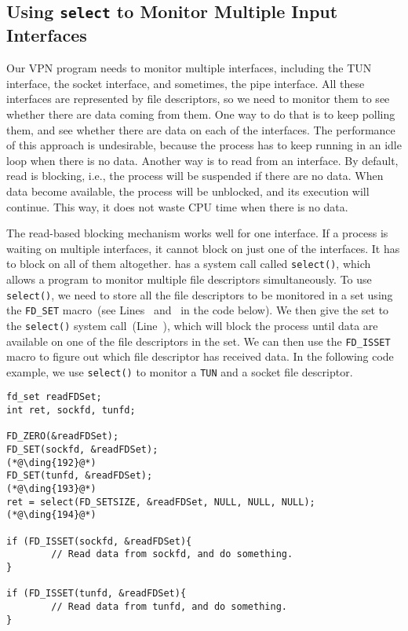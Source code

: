 \subsection{Using \texttt{select} to Monitor Multiple Input Interfaces}
\label{vpn:subsec:select}

Our VPN program needs to monitor multiple interfaces, including the TUN interface, the socket
interface, and sometimes, the pipe interface.   
All these interfaces are represented by file descriptors, so we need to 
monitor them to see whether there are data coming from them. 
One way to do that is to keep polling them, and
see whether there are data on each of the interfaces. The performance of this approach is
undesirable, because the process has to keep running in an idle loop when there is no data.
Another way is to read from an interface.  By default, read is blocking, i.e., the process will
be suspended if there are no data. When data become available, the process will be unblocked,
and its execution will continue. This way, it does not waste CPU time when there is no data.

The read-based blocking mechanism works well for one interface. If a process is waiting on
multiple interfaces, it cannot block on just one of the interfaces. It has to block on all of
them altogether.  \linux has a system call called \texttt{select()}, which
allows a program to monitor multiple file descriptors simultaneously.
To use \texttt{select()}, we need to store all the file descriptors to be monitored in a set
using the \texttt{FD\_SET} macro~(see Lines~ and~ in
the code below).  We then give the set to the \texttt{select()} system
call~(Line~), which will block the process until data are available on one of the
file descriptors in the set.  We can then use the \texttt{FD\_ISSET} macro to figure out which
file descriptor has received data. In the following code example, 
we use \texttt{select()} to monitor a \texttt{TUN} and a socket file
descriptor.


\begin{lstlisting}
fd_set readFDSet;
int ret, sockfd, tunfd;

FD_ZERO(&readFDSet);
FD_SET(sockfd, &readFDSet);                                (*@\ding{192}@*)
FD_SET(tunfd, &readFDSet);                                 (*@\ding{193}@*)
ret = select(FD_SETSIZE, &readFDSet, NULL, NULL, NULL);    (*@\ding{194}@*)

if (FD_ISSET(sockfd, &readFDSet){
        // Read data from sockfd, and do something.
}

if (FD_ISSET(tunfd, &readFDSet){
        // Read data from tunfd, and do something. 
}
\end{lstlisting}



